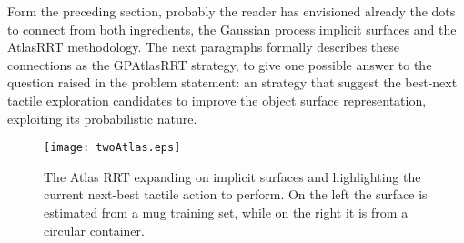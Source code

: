 Form the preceding section, probably the reader has envisioned already the dots to connect from both ingredients, the Gaussian process implicit surfaces and the AtlasRRT methodology. The next paragraphs formally describes these connections as the GPAtlasRRT strategy, to give one possible answer to the question raised in the problem statement: an strategy that suggest the best-next tactile exploration candidates to improve the object surface representation, exploiting its probabilistic nature. 

\begin{figure*}[htb]
    \centering
    \texttt{[image: twoAtlas.eps]}
    \caption{The Atlas RRT expanding on implicit surfaces and highlighting the current next-best tactile action to perform. On the left the surface is estimated from a mug training set, while on the right it is from a circular container.}
    \label{fig:GPAtlasRRTtwo}
\end{figure*}

